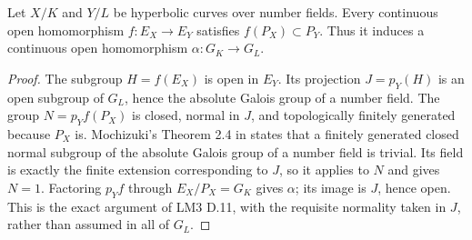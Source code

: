 \begin{proposition}
\label{A:absolute-geometric}
Let $X/K$ and $Y/L$ be hyperbolic curves over number fields.
Every continuous open homomorphism $f:E_X\to E_Y$ satisfies
$f(P_X)\subset P_Y$. Thus it induces a continuous open
homomorphism $\alpha:G_K\to G_L$.
\end{proposition}
\begin{proof}
The subgroup $H=f(E_X)$ is open in $E_Y$. Its projection
$J=p_Y(H)$ is an open subgroup of $G_L$, hence the absolute
Galois group of a number field. The group
$N=p_Yf(P_X)$ is closed, normal in $J$, and topologically
finitely generated because $P_X$ is. Mochizuki's
Theorem 2.4 in \cite{A_Mochizuki2006} states that a
finitely generated closed normal subgroup of the absolute
Galois group of a number field is trivial. Its field is
exactly the finite extension corresponding to $J$, so it
applies to $N$ and gives $N=1$. Factoring $p_Yf$ through
$E_X/P_X=G_K$ gives $\alpha$; its image is $J$, hence open.
This is the exact argument of LM3 D.11, with the requisite
normality taken in $J$, rather than assumed in all of $G_L$.
\end{proof}

